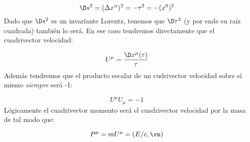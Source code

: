 \begin{equation}
\D s^2 = (\Delta x^{\alpha})^2 = - \tau^2= - (x^{0})^2
\end{equation}
Dado que $\D s^2$ es un invariante Lorentz, tenemos que $\D \tau^2$ (y por ende su raíz cuadrada) también lo será. En ese caso tendremos directamente que el cuadrivector velocidad:

\begin{equation}
    U^{\mu} = \frac{\D x^{\mu} (\tau)}{\tau}
\end{equation}
Además tendremos que el producto escalar de un cudrivector velocidad sobre sí mismo {\it siempre} será -1:

\begin{equation}
    U^{\mu} U_{\mu} = -1
\end{equation}
Lógicamente el cuadrivector momento será el cuadrivector velocidad por la masa de tal modo que: 

\begin{equation}
    P^{\mu} = m U^{\mu} = (E/c,\vn)
\end{equation}
